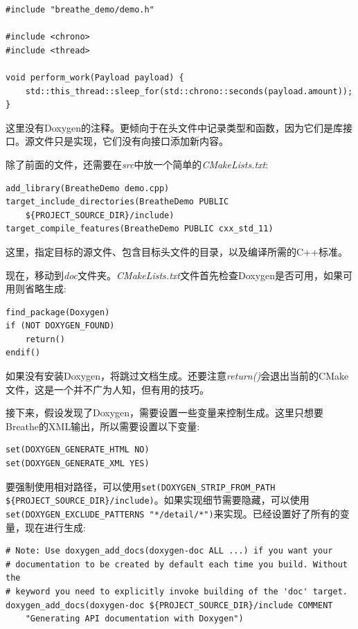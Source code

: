 \begin{lstlisting}[style=styleCXX]
#include "breathe_demo/demo.h"

#include <chrono>
#include <thread>

void perform_work(Payload payload) {
	std::this_thread::sleep_for(std::chrono::seconds(payload.amount));
}	
\end{lstlisting}

这里没有Doxygen的注释。更倾向于在头文件中记录类型和函数，因为它们是库接口。源文件只是实现，它们没有向接口添加新内容。

除了前面的文件，还需要在\textit{src}中放一个简单的\textit{CMakeLists.txt}:

\begin{lstlisting}[style=styleCMake]
add_library(BreatheDemo demo.cpp)
target_include_directories(BreatheDemo PUBLIC
	${PROJECT_SOURCE_DIR}/include)
target_compile_features(BreatheDemo PUBLIC cxx_std_11)
\end{lstlisting}

这里，指定目标的源文件、包含目标头文件的目录，以及编译所需的C++标准。

现在，移动到\textit{doc}文件夹。\textit{CMakeLists.txt}文件首先检查Doxygen是否可用，如果可用则省略生成:

\begin{lstlisting}[style=styleCMake]
find_package(Doxygen)
if (NOT DOXYGEN_FOUND)
	return()
endif()
\end{lstlisting}

如果没有安装Doxygen，将跳过文档生成。还要注意\textit{return()}会退出当前的CMake文件，这是一个并不广为人知，但有用的技巧。

接下来，假设发现了Doxygen，需要设置一些变量来控制生成。这里只想要Breathe的XML输出，所以需要设置以下变量:

\begin{lstlisting}[style=styleCMake]
set(DOXYGEN_GENERATE_HTML NO)
set(DOXYGEN_GENERATE_XML YES)
\end{lstlisting}

要强制使用相对路径，可以使用\texttt{set(DOXYGEN\_STRIP\_FROM\_PATH \$\{PROJECT\_SOURCE\_DIR\}/include)}。如果实现细节需要隐藏，可以使用\texttt{set(DOXYGEN\_EXCLUDE\_PATTERNS "*/detail/*")}来实现。已经设置好了所有的变量，现在进行生成:

\begin{lstlisting}[style=styleCMake]
# Note: Use doxygen_add_docs(doxygen-doc ALL ...) if you want your
# documentation to be created by default each time you build. Without the 
# keyword you need to explicitly invoke building of the 'doc' target.
doxygen_add_docs(doxygen-doc ${PROJECT_SOURCE_DIR}/include COMMENT
	"Generating API documentation with Doxygen")
\end{lstlisting}

